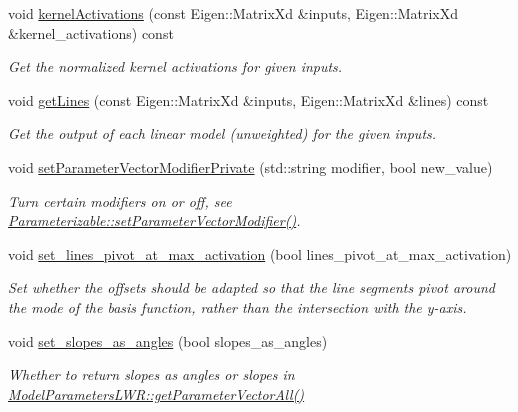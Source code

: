 \begin{DoxyCompactItemize}
void \hyperlink{classDmpBbo_1_1ModelParametersLWR_a125cc60559b55f7348beb15f25834b6f}{kernel\+Activations} (const Eigen\+::\+Matrix\+Xd \&inputs, Eigen\+::\+Matrix\+Xd \&kernel\+\_\+activations) const 
\begin{DoxyCompactList}\small\item\em Get the normalized kernel activations for given inputs. \end{DoxyCompactList}\item 
void \hyperlink{classDmpBbo_1_1ModelParametersLWR_ae8174f3d5e718d18c587c9bd50dc333f}{get\+Lines} (const Eigen\+::\+Matrix\+Xd \&inputs, Eigen\+::\+Matrix\+Xd \&lines) const 
\begin{DoxyCompactList}\small\item\em Get the output of each linear model (unweighted) for the given inputs. \end{DoxyCompactList}\item 
void \hyperlink{classDmpBbo_1_1ModelParametersLWR_add0186ca30d91928b887805fe0d24598}{set\+Parameter\+Vector\+Modifier\+Private} (std\+::string modifier, bool new\+\_\+value)
\begin{DoxyCompactList}\small\item\em Turn certain modifiers on or off, see \hyperlink{classDmpBbo_1_1Parameterizable_a6eefba9dfdcfe8878c10150074c6a68e}{Parameterizable\+::set\+Parameter\+Vector\+Modifier()}. \end{DoxyCompactList}\item 
void \hyperlink{classDmpBbo_1_1ModelParametersLWR_aea1a05d703891f1bab48039a23cb78b4}{set\+\_\+lines\+\_\+pivot\+\_\+at\+\_\+max\+\_\+activation} (bool lines\+\_\+pivot\+\_\+at\+\_\+max\+\_\+activation)
\begin{DoxyCompactList}\small\item\em Set whether the offsets should be adapted so that the line segments pivot around the mode of the basis function, rather than the intersection with the y-\/axis. \end{DoxyCompactList}\item 
void \hyperlink{classDmpBbo_1_1ModelParametersLWR_a812ed8332b71789b6d8fd9355ff94fa7}{set\+\_\+slopes\+\_\+as\+\_\+angles} (bool slopes\+\_\+as\+\_\+angles)
\begin{DoxyCompactList}\small\item\em Whether to return slopes as angles or slopes in \hyperlink{classDmpBbo_1_1ModelParametersLWR_a29429ff2771d1e56cfba7250d38da4b1}{Model\+Parameters\+L\+W\+R\+::get\+Parameter\+Vector\+All()} \end{DoxyCompactList}\item 

\end{DoxyCompactItemize}
